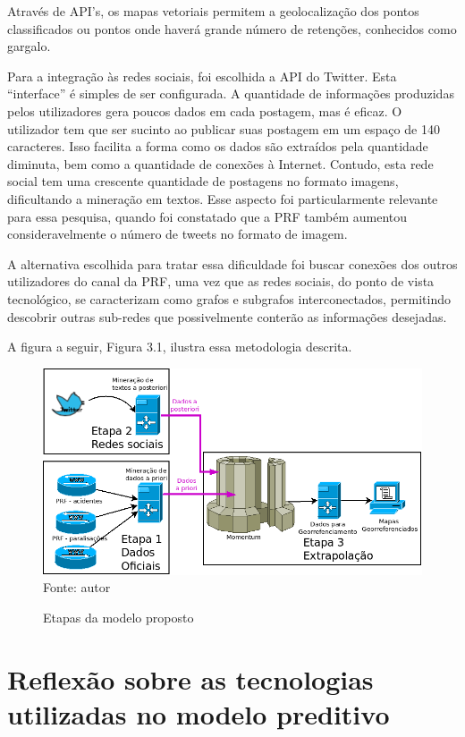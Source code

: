 Através de API's, os mapas vetoriais permitem a geolocalização dos pontos classificados ou pontos onde haverá grande número de retenções, conhecidos como gargalo.

Para a integração às redes sociais, foi escolhida a API do Twitter. Esta ``interface'' é simples de ser configurada. A quantidade de informações produzidas pelos utilizadores gera poucos dados em cada postagem, mas é eficaz. O utilizador tem que ser sucinto ao publicar suas postagem em um espaço de 140 caracteres. Isso facilita a forma como os dados são extraídos pela quantidade diminuta, bem como a quantidade de conexões à Internet. Contudo, esta rede social tem uma crescente quantidade de postagens no formato imagens, dificultando a mineração em textos. Esse aspecto foi particularmente relevante para essa pesquisa, quando foi constatado que a PRF também aumentou consideravelmente o número de tweets no formato de imagem. 

A alternativa escolhida para tratar essa dificuldade foi buscar conexões dos outros utilizadores do canal da PRF, uma vez que as redes sociais, do ponto de vista tecnológico, se caracterizam como grafos e subgrafos interconectados, permitindo descobrir outras sub-redes que possivelmente conterão as informações desejadas. 

A figura a seguir, Figura 3.1, ilustra essa metodologia descrita.

\begin{figure}[ht]
\centering
\caption{Etapas da modelo proposto}
\includegraphics[width=135mm, height=75	mm]{Figuras/Metodologia/metodologiaGeral3.png}\\
\tiny Fonte: autor
\end{figure}

\section{Reflexão sobre as tecnologias utilizadas no modelo preditivo}\label{result}

